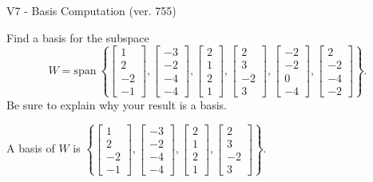 \begin{exercise}
  \begin{exerciseTitle}V7 - Basis Computation (ver. 755)\end{exerciseTitle}
  \begin{exerciseStatement}
    Find a basis for the subspace 
\[W=\mathrm{span}\ \left\{\left[\begin{array}{r}
1 \\
2 \\
-2 \\
-1
\end{array}\right] , \left[\begin{array}{r}
-3 \\
-2 \\
-4 \\
-4
\end{array}\right] , \left[\begin{array}{r}
2 \\
1 \\
2 \\
1
\end{array}\right] , \left[\begin{array}{r}
2 \\
3 \\
-2 \\
3
\end{array}\right] , \left[\begin{array}{r}
-2 \\
-2 \\
0 \\
-4
\end{array}\right] , \left[\begin{array}{r}
2 \\
-2 \\
-4 \\
-2
\end{array}\right]\right\}.\]
 Be sure to explain why your result is a basis.


  \end{exerciseStatement}
  \begin{exerciseAnswer}
   A basis of \(W\) is  \(\left\{\left[\begin{array}{r}
1 \\
2 \\
-2 \\
-1
\end{array}\right] , \left[\begin{array}{r}
-3 \\
-2 \\
-4 \\
-4
\end{array}\right] , \left[\begin{array}{r}
2 \\
1 \\
2 \\
1
\end{array}\right] , \left[\begin{array}{r}
2 \\
3 \\
-2 \\
3
\end{array}\right]\right\}\).
  


  \end{exerciseAnswer}
\end{exercise}